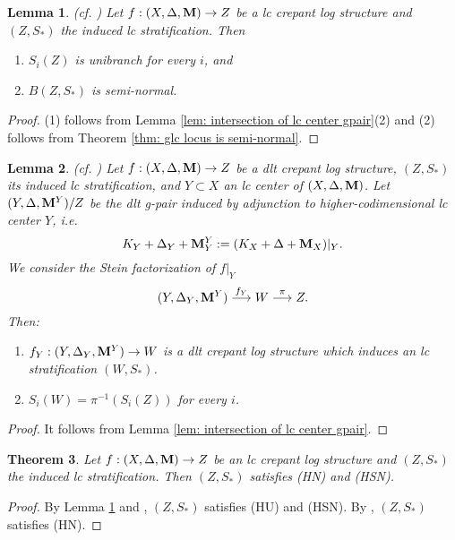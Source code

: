 \documentclass[11pt]{amsart}
\numberwithin{equation}{section}
\newcommand{\Mm}{{\bf{M}}}
\newtheorem{thm}{Theorem}[subsection]
\newtheorem{lem}[thm]{Lemma}
\theoremstyle{definition}
\theoremstyle{definition}
\theoremstyle{definition}
\begin{document}
\begin{lem}\label{lem: (Z,S) is U and SN}(cf. \cite[Lemma 5.26]{Kol13})
Let $f:(X,\Delta,\Mm)\to Z$ be a lc crepant log structure and $(Z,S_*)$ the induced lc stratification. Then
\begin{enumerate}
    \item  $S_i(Z)$ is unibranch for every $i$, and 
    \item  $B(Z,S_*)$ is semi-normal.
\end{enumerate}
\end{lem}

\begin{proof}
(1) follows from Lemma \ref{lem: intersection of lc center gpair}(2) and (2) follows from Theorem \ref{thm: glc locus is semi-normal}.
\end{proof}


\begin{lem}\label{lem: stratification is compatible under adjunction} (cf. \cite[Proposition 4.42]{Kol13})
Let $f: (X,\Delta,\Mm)\to Z$ be a dlt crepant log structure, $(Z,S_*)$ its induced lc stratification, and $Y\subset X$ an lc center of $(X,\Delta,\Mm)$. Let $(Y,\Delta,\Mm^Y)/Z$ be the dlt g-pair induced by adjunction to higher-codimensional lc center $Y$, i.e. 
$$K_Y+\Delta_Y+\Mm^Y_Y:=(K_X+\Delta+\Mm_X)|_Y.$$
We consider the Stein factorization of $f|_Y$
$$(Y,\Delta_Y,\Mm^Y)\stackrel{f_Y}{\longrightarrow}W\stackrel{\pi}{\longrightarrow}Z.$$
Then:
\begin{enumerate}
    \item $f_Y:(Y,\Delta_Y,\Mm^Y)\to W$ is a dlt crepant log structure which induces an lc stratification $(W,S_*)$.
    \item $S_i(W)=\pi^{-1}(S_i(Z))$ for every $i$.
\end{enumerate}
\end{lem}
\begin{proof}
It follows from Lemma \ref{lem: intersection of lc center gpair}.
\end{proof}

\begin{thm}\label{thm: (Z,S) is HN and HSN}
Let $f:(X,\Delta,\Mm)\to Z$ be an lc crepant log structure and $(Z,S_*)$ the induced lc stratification. Then $(Z,S_*)$ satisfies (HN) and (HSN).
\end{thm}
\begin{proof}
By Lemma \ref{lem: (Z,S) is U and SN} and \cite[Definitions 9.18,~9.19]{Kol13}, $(Z,S_*)$ satisfies (HU) and (HSN). By \cite[Theorem 9.21]{Kol13}, $(Z,S_*)$  satisfies (HN).
\end{proof}
\end{document}
